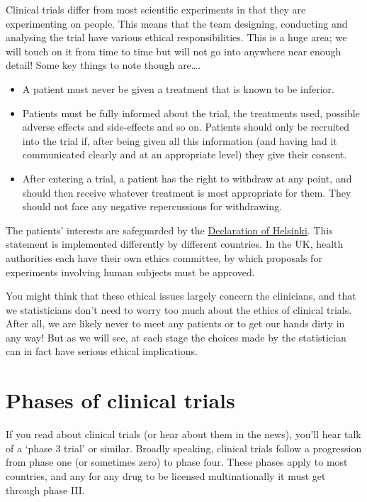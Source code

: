\documentclass[
  openany]{book}
\providecommand{\tightlist}{%
  \setlength{\itemsep}{0pt}\setlength{\parskip}{0pt}}
\theoremstyle{definition}
\theoremstyle{definition}
\theoremstyle{definition}
\theoremstyle{definition}
\theoremstyle{remark}
\begin{document}
Clinical trials differ from most scientific experiments in that they are experimenting on people. This means that the team designing, conducting and analysing the trial have various ethical responsibilities. This is a huge area; we will touch on it from time to time but will not go into anywhere near enough detail! Some key things to note though are\ldots.

\begin{itemize}
\tightlist
\item
  A patient must never be given a treatment that is known to be inferior.
\item
  Patients must be fully informed about the trial, the treatments used, possible adverse effects and side-effects and so on. Patients should only be recruited into the trial if, after being given all this information (and having had it communicated clearly and at an appropriate level) they give their consent.
\item
  After entering a trial, a patient has the right to withdraw at any point, and should then receive whatever treatment is most appropriate for them. They should not face any negative repercussions for withdrawing.
\end{itemize}

The patients' interests are safeguarded by the \href{https://www.wma.net/policies-post/wma-declaration-of-helsinki-ethical-principles-for-medical-research-involving-human-subjects/}{Declaration of Helsinki}. This statement is implemented differently by different countries. In the UK, health authorities each have their own ethics committee, by which proposals for experiments involving human subjects must be approved.

You might think that these ethical issues largely concern the clinicians, and that we statisticians don't need to worry too much about the ethics of clinical trials. After all, we are likely never to meet any patients or to get our hands dirty in any way! But as we will see, at each stage the choices made by the statistician can in fact have serious ethical implications.

\section{Phases of clinical trials}\label{phases-of-clinical-trials}

If you read about clinical trials (or hear about them in the news), you'll hear talk of a `phase 3 trial' or similar. Broadly speaking, clinical trials follow a progression from phase one (or sometimes zero) to phase four. These phases apply to most countries, and any for any drug to be licensed multinationally it must get through phase III.
\end{document}
